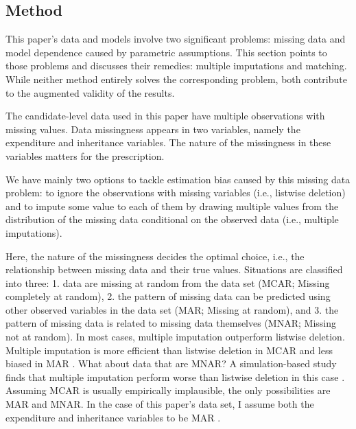\documentclass[a4paper, 12pt]{article}\usepackage[dvipdfmx]{graphicx}\usepackage[]{xcolor}
\begin{document}


\subsection{Method} \label{ch4.3}

This paper's data and models involve two significant problems: missing data and model dependence caused by parametric assumptions. This section points to those problems and discusses their remedies: multiple imputations and matching. While neither method entirely solves the corresponding problem, both contribute to the augmented validity of the results. 

The candidate-level data used in this paper have multiple observations with missing values. Data missingness appears in two variables, namely the expenditure and inheritance variables. The nature of the missingness in these variables matters for the prescription. 

We have mainly two options to tackle estimation bias caused by this missing data problem: to ignore the observations with missing variables (i.e., listwise deletion) and to impute some value to each of them by drawing multiple values from the distribution of the missing data conditional on the observed data (i.e., multiple imputations). 

Here, the nature of the missingness decides the optimal choice, i.e., the relationship between missing data and their true values. Situations are classified into three: 1. data are missing at random from the data set (MCAR; Missing completely at random), 2. the pattern of missing data can be predicted using other observed variables in the data set (MAR; Missing at random), and 3. the pattern of missing data is related to missing data themselves (MNAR; Missing not at random). In most cases, multiple imputation outperform listwise deletion. Multiple imputation is more efficient than listwise deletion in MCAR and less biased in MAR \footnotemark{} \citep{king2001analyzing}. What about data that are MNAR? A simulation-based study finds that multiple imputation perform worse than listwise deletion in this case \citep{pepinsky2018note}. Assuming MCAR is usually empirically implausible, the only possibilities are MAR and MNAR. In the case of this paper's data set, I assume both the expenditure and inheritance variables to be MAR \footnotemark{}. 

\end{document}
